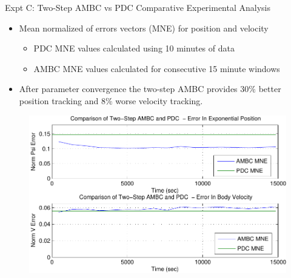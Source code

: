 \begin{frame}{Expt C: Two-Step AMBC vs PDC Comparative Experimental Analysis}

\begin{itemize}
\item<2->Mean normalized of errors vectors (MNE) for
  position and velocity
\begin{itemize}
\item<3->PDC MNE values calculated using 10 minutes of data%
\item<4->AMBC MNE values calculated for consecutive 15 minute windows%
\end{itemize}
\item<5->After parameter convergence the two-step AMBC provides
$30\%$ better position tracking and $8\%$ worse velocity tracking.
\end{itemize}

\begin{center}
\begin{figure}[htbp]
  \begin{center}
    \includegraphics[width=.8\textwidth]{./chUV_AMBC/images/MNE_All}
  \end{center}
\end{figure}
\end{center}

\end{frame}


